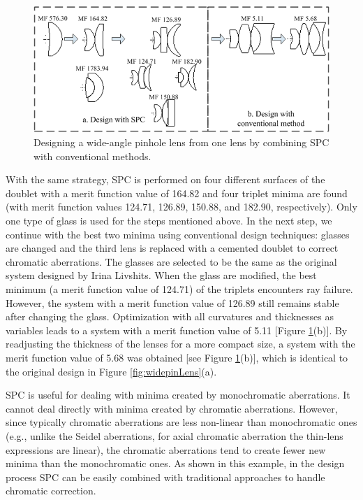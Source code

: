 \begin{figure}[h!]
    \centering
    \includegraphics[width=1.0\textwidth]{chapter-3/figures/WideAngleDesign.png}
    \caption{Designing a wide-angle pinhole lens from one lens by combining SPC with conventional methods.}
    \label{fig:WideAngleDesign}
\end{figure}

With the same strategy, SPC is performed on four different surfaces of the doublet with a merit function value of 164.82 and four triplet minima are found (with merit function values 124.71, 126.89, 150.88, and 182.90, respectively). Only one type of glass is used for the steps mentioned above. In the next step, we continue with the best two minima using conventional design techniques: glasses are changed and the third lens is replaced with a cemented doublet to correct chromatic aberrations. The glasses are selected to be the same as the original system designed by Irina Livshits. When the glass are modified, the best minimum (a merit function value of 124.71) of the triplets encounters ray failure. However, the system with a merit function value of 126.89 still remains stable after changing the glass. Optimization with all curvatures and thicknesses as variables leads to a system with a merit function value of 5.11 [Figure \ref{fig:WideAngleDesign}(b)]. By readjusting the thickness of the lenses for a more compact size, a system with the merit function value of 5.68 was obtained [see Figure \ref{fig:WideAngleDesign}(b)], which is identical to the original design in Figure \ref{fig:widepinLens}(a).

SPC is useful for dealing with minima created by monochromatic aberrations. It cannot deal directly with minima created by chromatic aberrations. However, since typically chromatic aberrations are less non-linear than monochromatic ones (e.g., unlike the Seidel aberrations, for axial chromatic aberration the thin-lens expressions are linear), the chromatic aberrations tend to create fewer new minima than the monochromatic
ones. As shown in this example, in the design process SPC can be easily combined with traditional approaches to handle chromatic correction.

